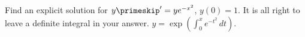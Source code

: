 {Find an explicit solution for $y\primeskip' = ye^{-x^2}$, $y(0)=1$.  It is all right to
leave a definite integral in your answer.}
{$y = \exp\left(\int_0^x e^{-t^2}\,dt\right)$.}
